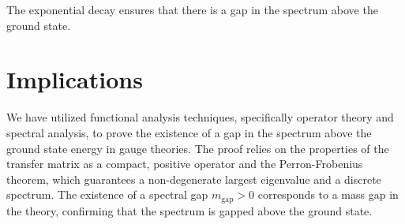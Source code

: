 The exponential decay ensures that there is a gap in the spectrum above the ground state.



\section{Implications}

We have utilized functional analysis techniques, specifically operator theory and spectral analysis, to prove the existence of a gap in the spectrum above the ground state energy in gauge theories. The proof relies on the properties of the transfer matrix as a compact, positive operator and the Perron-Frobenius theorem, which guarantees a non-degenerate largest eigenvalue and a discrete spectrum. The existence of a spectral gap \(m_{\text{gap}} > 0\) corresponds to a mass gap in the theory, confirming that the spectrum is gapped above the ground state.
